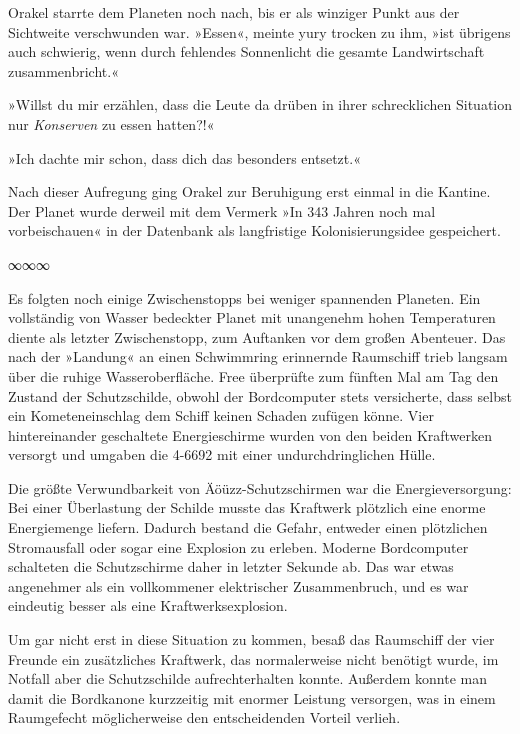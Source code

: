Orakel starrte dem Planeten noch nach, bis er als winziger Punkt aus der Sichtweite verschwunden war. »Essen«, meinte yury trocken zu ihm, »ist übrigens auch schwierig, wenn durch fehlendes Sonnenlicht die gesamte Landwirtschaft zusammenbricht.«

»Willst du mir erzählen, dass die Leute da drüben in ihrer schrecklichen Situation nur \textit{Konserven} zu essen hatten?!«

»Ich dachte mir schon, dass dich das besonders entsetzt.«

Nach dieser Aufregung ging Orakel zur Beruhigung erst einmal in die Kantine. Der Planet wurde derweil mit dem Vermerk »In 343 Jahren noch mal vorbeischauen« in der Datenbank als langfristige Kolonisierungsidee gespeichert.

\begin{center}
    ∞∞∞
\end{center}

Es folgten noch einige Zwischenstopps bei weniger spannenden Planeten. Ein vollständig von Wasser bedeckter Planet mit unangenehm hohen Temperaturen diente als letzter Zwischenstopp, zum Auftanken vor dem großen Abenteuer. Das nach der »Landung« an einen Schwimmring erinnernde Raumschiff trieb langsam über die ruhige Wasseroberfläche. Free überprüfte zum fünften Mal am Tag den Zustand der Schutzschilde, obwohl der Bordcomputer stets versicherte, dass selbst ein Kometeneinschlag dem Schiff keinen Schaden zufügen könne. Vier hintereinander geschaltete Energieschirme wurden von den beiden Kraftwerken versorgt und umgaben die 4-6692 mit einer undurchdringlichen Hülle.

Die größte Verwundbarkeit von Äöüzz-Schutzschirmen war die Energieversorgung: Bei einer Überlastung der Schilde musste das Kraftwerk plötzlich eine enorme Energiemenge liefern. Dadurch bestand die Gefahr, entweder einen plötzlichen Stromausfall oder sogar eine Explosion zu erleben. Moderne Bordcomputer schalteten die Schutzschirme daher in letzter Sekunde ab. Das war etwas angenehmer als ein vollkommener elektrischer Zusammenbruch, und es war eindeutig besser als eine Kraftwerksexplosion.

Um gar nicht erst in diese Situation zu kommen, besaß das Raumschiff der vier Freunde ein zusätzliches Kraftwerk, das normalerweise nicht benötigt wurde, im Notfall aber die Schutzschilde aufrechterhalten konnte. Außerdem konnte man damit die Bordkanone kurzzeitig mit enormer Leistung versorgen, was in einem Raumgefecht möglicherweise den entscheidenden Vorteil verlieh.


